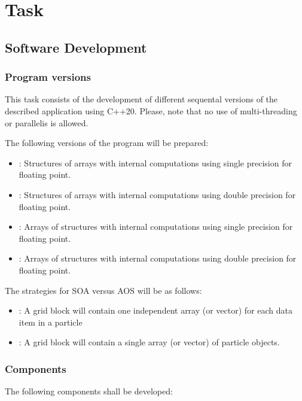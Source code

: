 \section{Task}

\subsection{Software Development}

\subsubsection{Program versions}
\label{sec:tasks:versions}

This task consists of the development of different sequental versions
of the described application using C++20. Please, note that no use of
multi-threading or parallelis is allowed.

The following versions of the program will be prepared:
\begin{itemize}
\item {}: Structures of arrays with internal computations
using single precision for floating point.
\item {}: Structures of arrays with internal computations
using double precision for floating point.
\item {}: Arrays of structures with internal computations
using single precision for floating point.
\item {}: Arrays of structures with internal computations
using double precision for floating point.
\end{itemize}

The strategies for SOA versus AOS will be as follows:

\begin{itemize}
  \item {}:
        A grid block will contain one independent array (or vector) for
        each data item in a particle
  \item {}:
        A grid block will contain a single array (or vector) of particle objects.
\end{itemize}

\subsubsection{Components}

The following components shall be developed:

